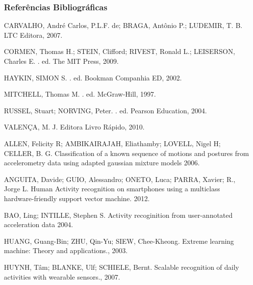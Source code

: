 \documentclass{beamer}
\begin{document}
\begin{frame}[allowframebreaks]
  \frametitle<presentation>{Referências Bibliográficas}
    
\begin{thebibliography}{10}
    
  \beamertemplatebookbibitems
		CARVALHO, Andr\'{e} Carlos, P.L.F. de; BRAGA, Ant\^{o}nio P.; LUDEMIR, T. B.
		\newblock LTC Editora, 2007.
		
		CORMEN, Thomas H.; STEIN, Clifford; RIVEST, Ronald L.; LEISERSON, Charles E.
		. ed. The MIT Press, 2009.
		
		HAYKIN, SIMON S.
		. ed. Bookman Companhia ED, 2002.
		
		MITCHELL, Thomas M.
		. ed. McGraw-Hill, 1997.
		
		RUSSEL, Stuart; NORVING, Peter.
		. ed. Pearson Education, 2004.
		
		VALEN{\c{C}}A, M. J.
		\newblock Editora Livro Rápido, 2010.
    
  \beamertemplatearticlebibitems
		ALLEN, Felicity R; AMBIKAIRAJAH, Eliathamby; LOVELL, Nigel H; CELLER, B. G.
		\newblock Classification of a known sequence of motions and postures from accelerometry data using adapted gaussian mixture models
		2006.
		
		ANGUITA, Davide; GUIO, Alessandro; ONETO, Luca; PARRA, Xavier; R., Jorge L.
		\newblock Human Activity recognition on smartphones using a multiclass hardware-friendly support vector machine.
		2012.
		
		BAO, Ling; INTILLE, Stephen S. 
		\newblock Activity recoginition from user-annotated acceleration data
		2004.
		
		HUANG, Guang-Bin; ZHU, Qin-Yu; SIEW, Chee-Kheong.
		\newblock Extreme learning machine: Theory and applications., 
		2003.
		
		HUYNH, Tâm; BLANKE, Ulf; SCHIELE, Bernt.
		\newblock Scalable recognition of daily activities with wearable sensors.,
		2007.
		

\end{thebibliography}
\end{frame}
\end{document}
